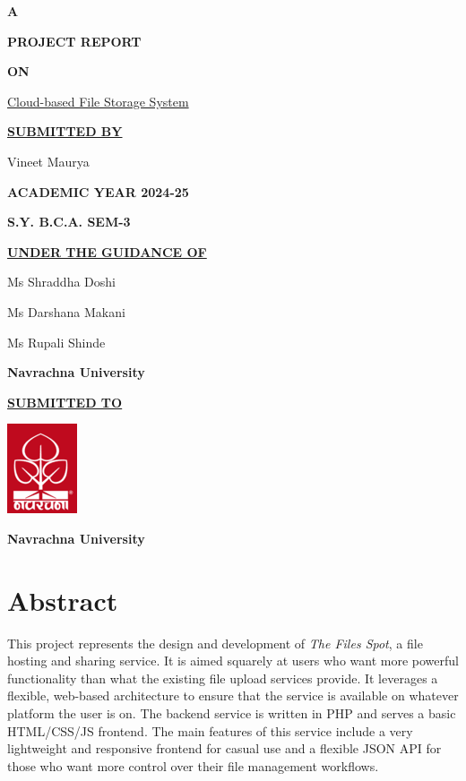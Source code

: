 \documentclass[12pt,a4paper]{report}
\begin{document}
\begin{center}
	\textbf{\LARGE{A}}

	\textbf{\LARGE{PROJECT REPORT}}

	\textbf{\LARGE{ON}}

	\Large{\underline{Cloud-based File Storage System}}
	\vspace{1cm}

	\textbf{\underline{SUBMITTED BY}}

	Vineet Maurya
	\vspace{1cm}

	\textbf{ACADEMIC YEAR 2024-25}

	\textbf{S.Y. B.C.A. SEM-3}
	\vspace{1cm}

	\textbf{\underline{UNDER THE GUIDANCE OF}}

	Ms Shraddha Doshi

	Ms Darshana Makani

	Ms Rupali Shinde

	\textbf{Navrachna University}
	\vspace{1cm}

	\textbf{\underline{SUBMITTED TO}}
	\vspace{0.5cm}

	\includegraphics{nuv_logo.png}
	\vspace{0.5cm}

	\textbf{Navrachna University}
\end{center}
\newpage
{}
\setcounter{page}{1}
\pagestyle{fancy}
\setlength{\headheight}{15pt}
\fancyhead[]{}
\fancyfoot[]{}
\chapter*{Abstract}
This project represents the design and development of \textit{The Files Spot}, a file hosting and sharing service. It is aimed squarely at users who want more powerful functionality than what the existing file upload services provide. It leverages a flexible, web-based architecture to ensure that the service is available on whatever platform the user is on. The backend service is written in PHP and serves a basic HTML/CSS/JS frontend. The main features of this service include a very lightweight and responsive frontend for casual use and a flexible JSON API for those who want more control over their file management workflows.
\newpage
\end{document}

